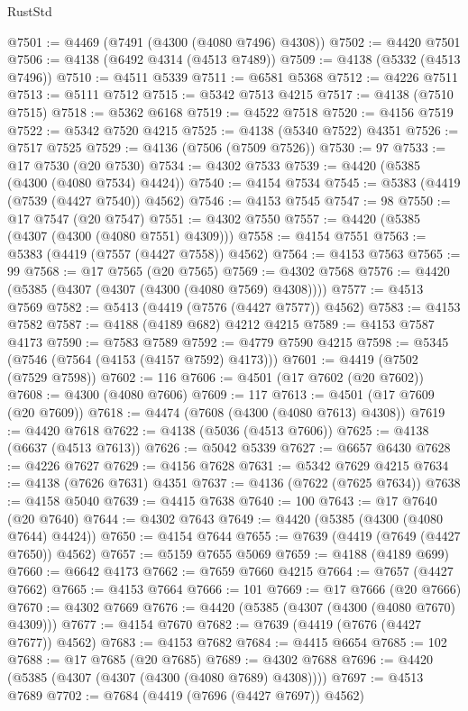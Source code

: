 \begin{lexlean}{RustStd}
\begin{coremodule}
@7501 := @4469 (@7491 (@4300 (@4080 @7496) @4308))
@7502 := @4420 @7501
@7506 := @4138 (@6492 @4314 (@4513 @7489))
@7509 := @4138 (@5332 (@4513 @7496))
@7510 := @4511 @5339
@7511 := @6581 @5368
@7512 := @4226 @7511
@7513 := @5111 @7512
@7515 := @5342 @7513 @4215
@7517 := @4138 (@7510 @7515)
@7518 := @5362 @6168
@7519 := @4522 @7518
@7520 := @4156 @7519
@7522 := @5342 @7520 @4215
@7525 := @4138 (@5340 @7522) @4351
@7526 := @7517 @7525
@7529 := @4136 (@7506 (@7509 @7526))
@7530 := 97
@7533 := @17 @7530 (@20 @7530)
@7534 := @4302 @7533
@7539 := @4420 (@5385 (@4300 (@4080 @7534) @4424))
@7540 := @4154 @7534
@7545 := @5383 (@4419 (@7539 (@4427 @7540)) @4562)
@7546 := @4153 @7545
@7547 := 98
@7550 := @17 @7547 (@20 @7547)
@7551 := @4302 @7550
@7557 := @4420 (@5385 (@4307 (@4300 (@4080 @7551) @4309)))
@7558 := @4154 @7551
@7563 := @5383 (@4419 (@7557 (@4427 @7558)) @4562)
@7564 := @4153 @7563
@7565 := 99
@7568 := @17 @7565 (@20 @7565)
@7569 := @4302 @7568
@7576 := @4420 (@5385 (@4307 (@4307 (@4300 (@4080 @7569) @4308))))
@7577 := @4513 @7569
@7582 := @5413 (@4419 (@7576 (@4427 @7577)) @4562)
@7583 := @4153 @7582
@7587 := @4188 (@4189 @682) @4212 @4215
@7589 := @4153 @7587 @4173
@7590 := @7583 @7589
@7592 := @4779 @7590 @4215
@7598 := @5345 (@7546 (@7564 (@4153 (@4157 @7592) @4173)))
@7601 := @4419 (@7502 (@7529 @7598))
@7602 := 116
@7606 := @4501 (@17 @7602 (@20 @7602))
@7608 := @4300 (@4080 @7606)
@7609 := 117
@7613 := @4501 (@17 @7609 (@20 @7609))
@7618 := @4474 (@7608 (@4300 (@4080 @7613) @4308))
@7619 := @4420 @7618
@7622 := @4138 (@5036 (@4513 @7606))
@7625 := @4138 (@6637 (@4513 @7613))
@7626 := @5042 @5339
@7627 := @6657 @6430
@7628 := @4226 @7627
@7629 := @4156 @7628
@7631 := @5342 @7629 @4215
@7634 := @4138 (@7626 @7631) @4351
@7637 := @4136 (@7622 (@7625 @7634))
@7638 := @4158 @5040
@7639 := @4415 @7638
@7640 := 100
@7643 := @17 @7640 (@20 @7640)
@7644 := @4302 @7643
@7649 := @4420 (@5385 (@4300 (@4080 @7644) @4424))
@7650 := @4154 @7644
@7655 := @7639 (@4419 (@7649 (@4427 @7650)) @4562)
@7657 := @5159 @7655 @5069
@7659 := @4188 (@4189 @699)
@7660 := @6642 @4173
@7662 := @7659 @7660 @4215
@7664 := @7657 (@4427 @7662)
@7665 := @4153 @7664
@7666 := 101
@7669 := @17 @7666 (@20 @7666)
@7670 := @4302 @7669
@7676 := @4420 (@5385 (@4307 (@4300 (@4080 @7670) @4309)))
@7677 := @4154 @7670
@7682 := @7639 (@4419 (@7676 (@4427 @7677)) @4562)
@7683 := @4153 @7682
@7684 := @4415 @6654
@7685 := 102
@7688 := @17 @7685 (@20 @7685)
@7689 := @4302 @7688
@7696 := @4420 (@5385 (@4307 (@4307 (@4300 (@4080 @7689) @4308))))
@7697 := @4513 @7689
@7702 := @7684 (@4419 (@7696 (@4427 @7697)) @4562)

\end{coremodule}
\end{lexlean}

